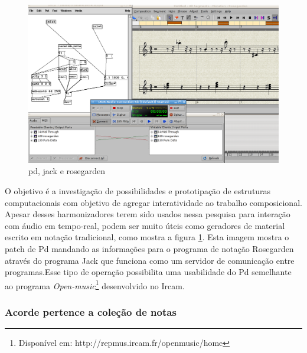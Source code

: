 \documentclass{ppgmus}
\begin{document}
\begin{figure}
\includegraphics[scale=.4]{harm5}
\caption{pd, jack e rosegarden}
\label{harm5}
\end{figure}

O objetivo é a investigação de possibilidades e prototipação de estruturas computacionais com 
objetivo de agregar interatividade ao trabalho composicional.  
	Apesar desses harmonizadores terem sido usados nessa pesquisa para interação com áudio em 
tempo-real, podem ser muito úteis como geradores de material escrito em notação tradicional, 
como mostra a figura \ref{harm5}. Esta imagem mostra o patch de Pd mandando as informações para o programa 
de notação Rosegarden através do programa Jack que funciona como um servidor de comunicação entre 
programas.Esse tipo de operação possibilita uma usabilidade do Pd semelhante ao programa \textit{Open-music}\footnote{Disponível em:
http://repmus.ircam.fr/openmusic/home}
desenvolvido no Ircam.


\subsubsection{Acorde pertence a coleção de notas}
\end{document}
